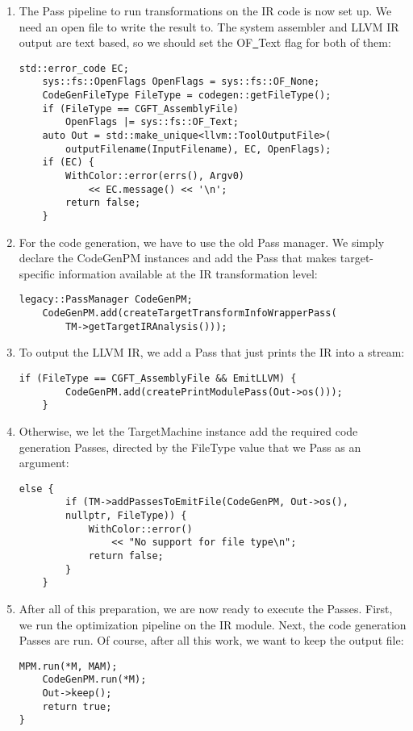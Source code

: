 \begin{enumerate}
\item The Pass pipeline to run transformations on the IR code is now set up. We need an open file to write the result to. The system assembler and LLVM IR output are text based, so we should set the OF\underline{~}Text flag for both of them:
\begin{lstlisting}[caption={}]
	std::error_code EC;
	sys::fs::OpenFlags OpenFlags = sys::fs::OF_None;
	CodeGenFileType FileType = codegen::getFileType();
	if (FileType == CGFT_AssemblyFile)
		OpenFlags |= sys::fs::OF_Text;
	auto Out = std::make_unique<llvm::ToolOutputFile>(
		outputFilename(InputFilename), EC, OpenFlags);
	if (EC) {
		WithColor::error(errs(), Argv0)
			<< EC.message() << '\n';
		return false;
	}
\end{lstlisting}

\item For the code generation, we have to use the old Pass manager. We simply declare the CodeGenPM instances and add the Pass that makes target-specific information available at the IR transformation level:
\begin{lstlisting}[caption={}]
	legacy::PassManager CodeGenPM;
	CodeGenPM.add(createTargetTransformInfoWrapperPass(
		TM->getTargetIRAnalysis()));
\end{lstlisting}

\item To output the LLVM IR, we add a Pass that just prints the IR into a stream:
\begin{lstlisting}[caption={}]
	if (FileType == CGFT_AssemblyFile && EmitLLVM) {
		CodeGenPM.add(createPrintModulePass(Out->os()));
	}
\end{lstlisting}

\item Otherwise, we let the TargetMachine instance add the required code generation Passes, directed by the FileType value that we Pass as an argument:
\begin{lstlisting}[caption={}]
	 else {
		if (TM->addPassesToEmitFile(CodeGenPM, Out->os(),
		nullptr, FileType)) {
			WithColor::error()
				<< "No support for file type\n";
			return false;
		}
	}
\end{lstlisting}

\item After all of this preparation, we are now ready to execute the Passes. First, we run the optimization pipeline on the IR module. Next, the code generation Passes are run. Of course, after all this work, we want to keep the output file:
\begin{lstlisting}[caption={}]
	MPM.run(*M, MAM);
	CodeGenPM.run(*M);
	Out->keep();
	return true;
}
\end{lstlisting}


\end{enumerate}
